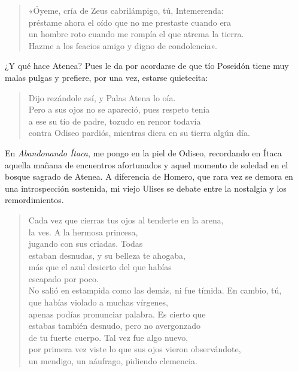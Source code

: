 \begin{verse}
«Óyeme, cría de Zeus cabrilámpigo, tú, Intemerenda:\\
préstame ahora el oído que no me prestaste cuando era\\
un hombre roto cuando me rompía el que atrema la tierra.\\
Hazme a los feacios amigo y digno de condolencia».
\end{verse}

¿Y qué hace Atenea? Pues le da por acordarse de que tío Poseidón tiene muy malas pulgas y prefiere, por una vez, estarse quietecita:

\begin{verse}
Dijo rezándole así, y Palas Atena lo oía.\\
Pero a sus ojos no se apareció, pues respeto tenía\\
a ese su tío de padre, tozudo en rencor todavía\\
contra Odiseo pardiós, mientras diera en su tierra algún día.
\end{verse}

En \emph{Abandonando Ítaca}, me pongo en la piel de Odiseo, recordando en Ítaca aquella mañana de encuentros afortunados y aquel momento de soledad en el bosque sagrado de Atenea. A diferencia de Homero, que rara vez se demora en una introspección sostenida, mi viejo Ulises se debate entre la nostalgia y los remordimientos.

\begin{verse}
Cada vez que cierras tus ojos al tenderte en la arena,\\
la ves. A la hermosa princesa,\\
jugando con sus criadas. Todas\\
estaban desnudas, y su belleza te ahogaba,\\
más que el azul desierto del que habías\\
escapado por poco.\\
No salió en estampida como las demás, ni fue tímida. En cambio, tú,\\
que habías violado a muchas vírgenes,\\
apenas podías pronunciar palabra. Es cierto que\\
estabas también desnudo, pero no avergonzado\\
de tu fuerte cuerpo. Tal vez fue algo nuevo,\\
por primera vez viste lo que sus ojos vieron observándote,\\
un mendigo, un náufrago, pidiendo clemencia.
\end{verse}

